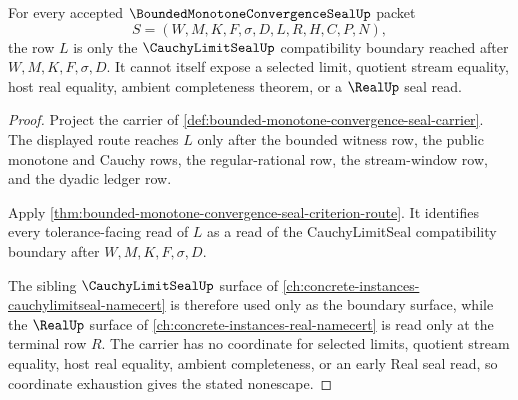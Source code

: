 \begin{theorem}
\label{thm:bounded-monotone-convergence-seal-limit-seal-compatibility}
For every accepted $\BoundedMonotoneConvergenceSealUp$ packet
$$
S=(W,M,K,F,\sigma,D,L,R,H,C,P,N),
$$
the row $L$ is only the $\CauchyLimitSealUp$ compatibility boundary reached after $W,M,K,F,\sigma,D$. It cannot itself expose a selected limit, quotient stream equality, host real equality, ambient completeness theorem, or a $\RealUp$ seal read.
\end{theorem}
\begin{proof}
Project the carrier of \autoref{def:bounded-monotone-convergence-seal-carrier}. The displayed route reaches $L$ only after the bounded witness row, the public monotone and Cauchy rows, the regular-rational row, the stream-window row, and the dyadic ledger row.

Apply \autoref{thm:bounded-monotone-convergence-seal-criterion-route}. It identifies every tolerance-facing read of $L$ as a read of the CauchyLimitSeal compatibility boundary after $W,M,K,F,\sigma,D$.

The sibling $\CauchyLimitSealUp$ surface of \autoref{ch:concrete-instances-cauchylimitseal-namecert} is therefore used only as the boundary surface, while the $\RealUp$ surface of \autoref{ch:concrete-instances-real-namecert} is read only at the terminal row $R$. The carrier has no coordinate for selected limits, quotient stream equality, host real equality, ambient completeness, or an early Real seal read, so coordinate exhaustion gives the stated nonescape.
\end{proof}

